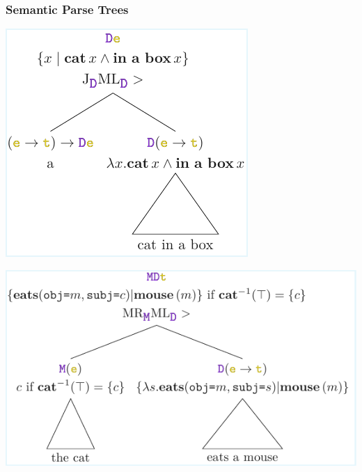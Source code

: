 \documentclass[math, english, info]{beamercours}
\begin{document}
\begin{frame}
	\frametitle{Semantic Parse Trees}
	\includegraphics{aux/figures/parse-tree-1.pdf}

	\centering

	\includegraphics{aux/figures/parse-tree-2.pdf}


\end{frame}
\end{document}
